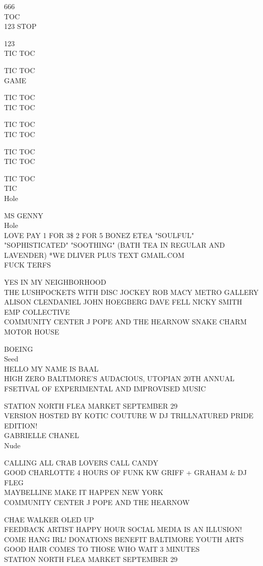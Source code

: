 \documentclass[10pt,letterpaper]{article}
\begin{document}
666\\
TOC\\
123 STOP

123\\
TIC TOC

TIC TOC\\
GAME

TIC TOC\\
TIC TOC

TIC TOC\\
TIC TOC

TIC TOC\\
TIC TOC

TIC TOC\\
TIC\\
Hole

MS GENNY\\
Hole\\
LOVE PAY 1 FOR 3\$ 2 FOR 5 BONEZ ETEA "SOULFUL" "SOPHISTICATED" "SOOTHING" (BATH TEA IN REGULAR AND LAVENDER) *WE DLIVER PLUS TEXT GMAIL.COM\\
FUCK TERFS

YES IN MY NEIGHBORHOOD\\
THE LUSHPOCKETS WITH DISC JOCKEY ROB MACY METRO GALLERY\\
ALISON CLENDANIEL JOHN HOEGBERG DAVE FELL NICKY SMITH EMP COLLECTIVE\\
COMMUNITY CENTER J POPE AND THE HEARNOW SNAKE CHARM MOTOR HOUSE

BOEING\\
Seed\\
HELLO MY NAME IS BAAL\\
HIGH ZERO BALTIMORE'S AUDACIOUS, UTOPIAN 20TH ANNUAL FSETIVAL OF EXPERIMENTAL AND IMPROVISED MUSIC

STATION NORTH FLEA MARKET SEPTEMBER 29\\
VERSION HOSTED BY KOTIC COUTURE W DJ TRILLNATURED PRIDE EDITION!\\
GABRIELLE CHANEL\\
Nude

CALLING ALL CRAB LOVERS CALL CANDY\\
GOOD CHARLOTTE 4 HOURS OF FUNK KW GRIFF + GRAHAM \& DJ FLEG\\
MAYBELLINE MAKE IT HAPPEN NEW YORK\\
COMMUNITY CENTER J POPE AND THE HEARNOW

CHAE WALKER OLED UP\\
FEEDBACK ARTIST HAPPY HOUR SOCIAL MEDIA IS AN ILLUSION!  COME HANG IRL!  DONATIONS BENEFIT BALTIMORE YOUTH ARTS\\
GOOD HAIR COMES TO THOSE WHO WAIT 3 MINUTES\\
STATION NORTH FLEA MARKET SEPTEMBER 29
\end{document}
